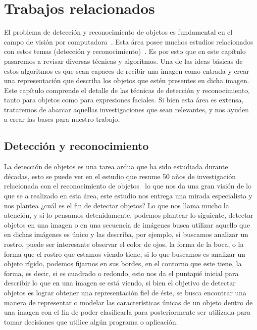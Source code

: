 \chapter[Trabajos relacionados ]{Trabajos relacionados }\label{ch:capitulo2}

El problema de detección y reconocimiento de objetos es fundamental en el campo de visión por computadora~\cite{Felzenszwalb2005}. Esta área posee muchos estudios relacionados con estos temas (detección y reconocimiento)~\cite{Andreopoulos2013}. Es por esto que en este capítulo pasaremos a revisar diversas técnicas y algoritmos. Una de las ideas básicas de estos algoritmos es que sean capaces de recibir una imagen como entrada y crear una representación que describa los objetos que estén presentes en dicha imagen. Este capítulo comprende el detalle de las técnicas de detección y reconocimiento, tanto para objetos como para expresiones faciales. Si bien esta área es extensa, trataremos de abarcar aquellas investigaciones que sean relevantes, y nos ayuden a crear las bases para nuestro trabajo.

\section{Detección y reconocimiento}
La detección de objetos es una tarea ardua que ha sido estudiada durante décadas, esto se puede ver en el estudio que resume 50 años de investigación relacionada con el reconocimiento de objetos~\cite{Andreopoulos2013} lo que nos da una gran visión de lo que se a realizado en esta área, este estudio nos entrega una mirada especialista y nos plantea ¿cuál es el fin de detectar objetos? Lo que nos llama mucho la atención, y si lo pensamos detenidamente, podemos plantear lo siguiente, detectar objetos en una imagen o en una secuencia de imágenes busca utilizar aquello que en dichas imágenes es único y las describa, por ejemplo, si buscamos analizar un rostro, puede ser interesante observar el color de ojos, la forma de la boca, o la forma que el rostro que estamos viendo tiene, si lo que buscamos es analizar un objeto rígido, podemos fijarnos en sus bordes, en el contorno que este tiene, la forma, es decir, si es cuadrado o redondo, esto nos da el puntapié inicial para describir lo que en una imagen se está viendo, si bien el objetivo de detectar objetos es lograr obtener una representación fiel de éste, se busca encontrar una manera de representar o modelar las características únicas de un objeto dentro de una imagen con el fin de poder clasificarla para posteriormente ser utilizada para tomar decisiones que utilice algún programa o aplicación.

